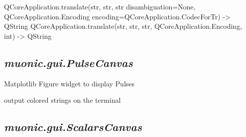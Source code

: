 \documentclass[letterpaper,10pt,english]{sphinxmanual}
\begin{document}

\begin{fulllineitems}
\label{muonic:muonic.gui.PeriodicCallDialog.tr}
QCoreApplication.translate(str, str, str disambiguation=None, QCoreApplication.Encoding encoding=QCoreApplication.CodecForTr) -\textgreater{} QString
QCoreApplication.translate(str, str, str, QCoreApplication.Encoding, int) -\textgreater{} QString

\end{fulllineitems}



\subsection{\emph{muonic.gui.PulseCanvas}}
\label{muonic:muonic-gui-pulsecanvas}\label{muonic:module-muonic.gui.PulseCanvas}

\begin{fulllineitems}
\label{muonic:muonic.gui.PulseCanvas.PulseCanvas}
Matplotlib Figure widget to display Pulses

\begin{fulllineitems}
\label{muonic:muonic.gui.PulseCanvas.PulseCanvas.color}
output colored strings on the terminal

\end{fulllineitems}


\begin{fulllineitems}
\label{muonic:muonic.gui.PulseCanvas.PulseCanvas.update_plot}
\end{fulllineitems}


\end{fulllineitems}



\subsection{\emph{muonic.gui.ScalarsCanvas}}
\label{muonic:muonic-gui-scalarscanvas}\label{muonic:module-muonic.gui.ScalarsCanvas}
\end{document}
